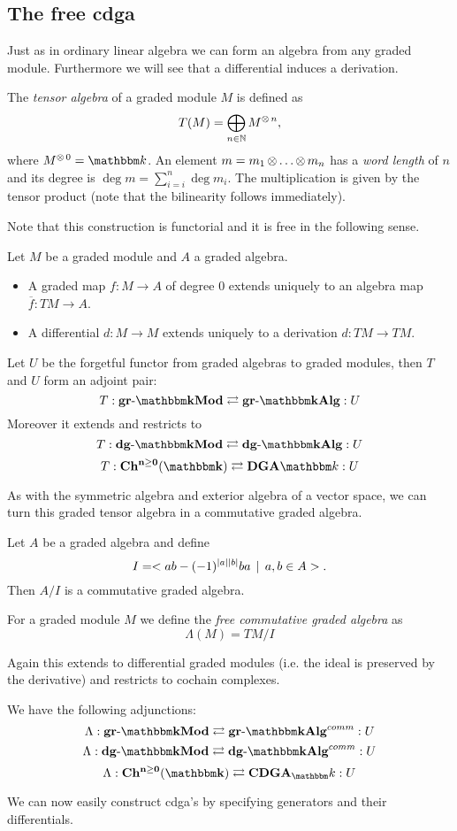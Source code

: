 
\subsection{The free cdga}
\label{sec:free-cdga}

Just as in ordinary linear algebra we can form an algebra from any graded module. Furthermore we will see that a differential induces a derivation.

\begin{definition}
	The \emph{tensor algebra} of a graded module $M$ is defined as
	$$ T(M) = \bigoplus_{n\in\mathbb{N}} M^{\operatorname*{\otimes} n}, $$
	where $M^{\tensor 0} = \k$. An element $m = m_1 \operatorname*{\otimes} \ldots \operatorname*{\otimes} m_n$ has a \emph{word length} of $n$ and its degree is $\deg{m} = \sum_{i=i}^n \deg{m_i}$. The multiplication is given by the tensor product (note that the bilinearity follows immediately).
\end{definition}

Note that this construction is functorial and it is free in the following sense.

\begin{lemma}
	Let $M$ be a graded module and $A$ a graded algebra.
	\begin{itemize}
		\item A graded map $f: M \to A$ of degree $0$ extends uniquely to an algebra map $\overline{f} : TM \to A$.
		\item A differential $d: M \to M$ extends uniquely to a derivation $d: TM \to TM$.
	\end{itemize}
\end{lemma}

\begin{corollary}
	Let $U$ be the forgetful functor from graded algebras to graded modules, then $T$ and $U$ form an adjoint pair:
	$$ T: \grMod{\k} \leftadj \grAlg{\k} :U $$
	Moreover it extends and restricts to
	$$ T: \dgMod{\k} \leftadj \dgAlg{\k} :U $$
	$$ T: \CoCh{\k} \leftadj \DGA{\k} :U $$
\end{corollary}

As with the symmetric algebra and exterior algebra of a vector space, we can turn this graded tensor algebra in a commutative graded algebra.

\begin{definition}
	Let $A$ be a graded algebra and define
	$$ I = < ab - (-1)^{{|{a}|}{|{b}|}}ba \,\mid\, a,b \in A >. $$
	Then $A / I$ is a commutative graded algebra.

	For a graded module $M$ we define the \emph{free commutative graded algebra} as
	$$ \Lambda(M) = TM / I $$
\end{definition}

Again this extends to differential graded modules (i.e. the ideal is preserved by the derivative) and restricts to cochain complexes.

\begin{lemma}
	We have the following adjunctions:
	$$ \Lambda: \grMod{\k} \leftadj \grAlg{\k}^{comm} :U $$
	$$ \Lambda: \dgMod{\k} \leftadj \dgAlg{\k}^{comm} :U $$
	$$ \Lambda: \CoCh{\k} \leftadj \CDGA_\k :U $$
\end{lemma}

We can now easily construct cdga's by specifying generators and their differentials.
